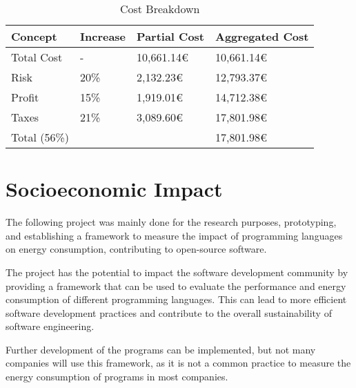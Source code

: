 \begin{table}[h]
    \centering
    \begin{tabular}{|l|l|l|l|}
        \hline
        \textbf{Concept}    & \textbf{Increase} & \textbf{Partial Cost} & \textbf{Aggregated Cost} \\
        \hline
        Total Cost          & -       & 10,661.14€  & 10,661.14€ \\
        Risk                & 20\%    & 2,132.23€   & 12,793.37€ \\
        Profit              & 15\%    & 1,919.01€   & 14,712.38€ \\
        Taxes               & 21\%    & 3,089.60€   & 17,801.98€ \\
        \hline
        Total (56\%)        &         &             & 17,801.98€ \\
        \hline
    \end{tabular}
    \caption{Cost Breakdown}
    \label{tab:cost-breakdown}
\end{table}


\section{Socioeconomic Impact}
The following project was mainly done for the research purposes, prototyping, and establishing a framework to measure the impact of programming languages on energy consumption, contributing to open-source software.

The project has the potential to impact the software development community by providing a framework that can be used to evaluate the performance and energy consumption of different programming languages. This can lead to more efficient software development practices and contribute to the overall sustainability of software engineering.

Further development of the programs can be implemented, but not many companies will use this framework, as it is not a common practice to measure the energy consumption of programs in most companies.

